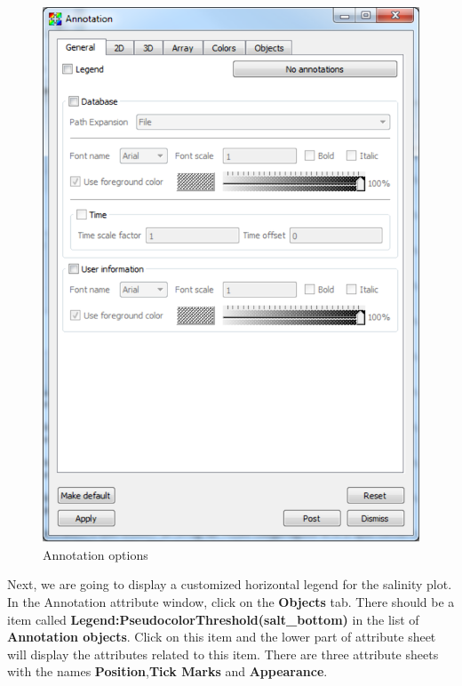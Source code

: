 \documentclass[12pt]{report}
\begin{document}
			  \begin{figure}
        \begin{center}
        \includegraphics{annotationGeneral}
        \caption{Annotation options}
        \label{figure:annotationGeneral}
        \end{center}
        \end{figure} 
			
Next, we are going to display a customized horizontal legend for the salinity plot. 
In the Annotation attribute window, click on  the {\bf Objects} tab. There should be a item 
called {\bf Legend:Pseudocolor\-Threshold(salt\_bottom)} in the list of {\bf Annotation objects}. 
Click on this item and the lower part of attribute sheet will display the attributes related to this item. 
There are three attribute sheets with the names {\bf Position},{\bf Tick Marks} and {\bf Appearance}.
				
\end{document}
